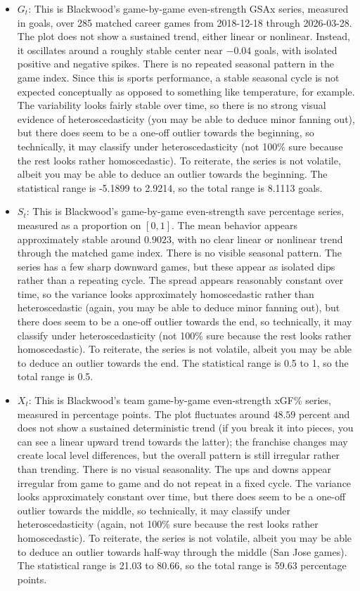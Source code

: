 \documentclass[
  10pt,
]{extarticle}
\providecommand{\tightlist}{%
  \setlength{\itemsep}{0pt}\setlength{\parskip}{0pt}}
\begin{document}
\begin{itemize}
\tightlist
\item
  \(G_t\): This is Blackwood's game-by-game even-strength GSAx series, measured in goals, over 285 matched career games from 2018-12-18 through 2026-03-28. The plot does not show a sustained trend, either linear or nonlinear. Instead, it oscillates around a roughly stable center near \(-0.04\) goals, with isolated positive and negative spikes. There is no repeated seasonal pattern in the game index. Since this is sports performance, a stable seasonal cycle is not expected conceptually as opposed to something like temperature, for example. The variability looks fairly stable over time, so there is no strong visual evidence of heteroscedasticity (you may be able to deduce minor fanning out), but there does seem to be a one-off outlier towards the beginning, so technically, it may classify under heteroscedasticity (not 100\% sure because the rest looks rather homoscedastic). To reiterate, the series is not volatile, albeit you may be able to deduce an outlier towards the beginning. The statistical range is -5.1899 to 2.9214, so the total range is 8.1113 goals.
\item
  \(S_t\): This is Blackwood's game-by-game even-strength save percentage series, measured as a proportion on \([0,1]\). The mean behavior appears approximately stable around \(0.9023\), with no clear linear or nonlinear trend through the matched game index. There is no visible seasonal pattern. The series has a few sharp downward games, but these appear as isolated dips rather than a repeating cycle. The spread appears reasonably constant over time, so the variance looks approximately homoscedastic rather than heteroscedastic (again, you may be able to deduce minor fanning out), but there does seem to be a one-off outlier towards the end, so technically, it may classify under heteroscedasticity (not 100\% sure because the rest looks rather homoscedastic). To reiterate, the series is not volatile, albeit you may be able to deduce an outlier towards the end. The statistical range is 0.5 to 1, so the total range is 0.5.
\item
  \(X_t\): This is Blackwood's team game-by-game even-strength xGF\% series, measured in percentage points. The plot fluctuates around \(48.59\) percent and does not show a sustained deterministic trend (if you break it into pieces, you can see a linear upward trend towards the latter); the franchise changes may create local level differences, but the overall pattern is still irregular rather than trending. There is no visual seasonality. The ups and downs appear irregular from game to game and do not repeat in a fixed cycle. The variance looks approximately constant over time, but there does seem to be a one-off outlier towards the middle, so technically, it may classify under heteroscedasticity (again, not 100\% sure because the rest looks rather homoscedastic). To reiterate, the series is not volatile, albeit you may be able to deduce an outlier towards half-way through the middle (San Jose games). The statistical range is 21.03 to 80.66, so the total range is 59.63 percentage points.

\end{itemize}
\end{document}
